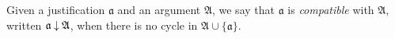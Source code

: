 \begin{definition}[Compatibility]
  Given a justification $\mathfrak{a}$ and an argument $\mathfrak{A}$, we say
  that $\mathfrak{a}$ is \emph{compatible} with $\mathfrak{A}$, written
  $\mathfrak{a} \mathbin{\downarrow} \mathfrak{A}$, when there is no cycle in $\mathfrak{A}
  \cup \{\mathfrak{a}\}$.
\end{definition}


  
